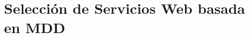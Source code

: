 \chapter{Selección de Servicios Web basada en MDD}
\label{Seleccion de Servicios Web basada en MDD} 





